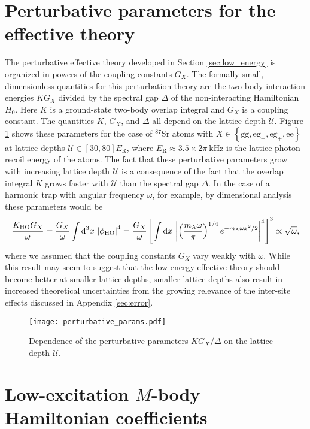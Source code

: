 \documentclass[preprint,showkeys,nofootinbib]{revtex4-1}
\renewcommand{\t}{\text} %
\newcommand{\f}{\dfrac} %
\newcommand{\p}[1]{\left(#1\right)} %
\renewcommand{\sp}[1]{\left[#1\right]} %
\renewcommand{\set}[1]{\left\{#1\right\}} %
\renewcommand{\d}{\text{d}}
\newcommand{\g}{\text{g}}
\newcommand{\e}{\text{e}}
\newcommand{\U}{\mathcal{U}}
\newcommand{\1}{\mathds{1}}
\newcommand{\mA}{m_{\text{A}}} %
\begin{document}
\section{Perturbative parameters for the effective theory}
\label{sec:pert_params}

The perturbative effective theory developed in Section
\ref{sec:low_energy} is organized in powers of the coupling constants
$G_X$.  The formally small, dimensionless quantities for this
perturbation theory are the two-body interaction energies $K G_X$
divided by the spectral gap $\Delta$ of the non-interacting
Hamiltonian $H_0$.  Here $K$ is a ground-state two-body overlap
integral and $G_X$ is a coupling constant.  The quantities $K$, $G_X$,
and $\Delta$ all depend on the lattice depth $\U$.  Figure
\ref{fig:pert_params} shows these parameters for the case of
${}^{87}$Sr atoms with $X\in\set{\g\g, \e\g_-, \e\g_+, \e\e}$ at
lattice depths $\U\in\sp{30,80}E_{\t{R}}$, where
$E_{\t{R}}\approx3.5\times2\pi~\t{kHz}$ is the lattice photon recoil
energy of the atoms.  The fact that these perturbative parameters grow
with increasing lattice depth $\U$ is a consequence of the fact that
the overlap integral $K$ grows faster with $\U$ than the spectral gap
$\Delta$.  In the case of a harmonic trap with angular frequency
$\omega$, for example, by dimensional analysis these parameters would
be
\begin{align}
  \f{K_{\t{HO}} G_X}{\omega}
  = \f{G_X}{\omega} \int \d^3 x~\abs{\phi_{\t{HO}}}^4
  = \f{G_X}{\omega} \sp{\int \d x~
    \abs{\p{\f{\mA\omega}{\pi}}^{1/4} e^{-\mA\omega x^2/2}}^4}^3
  \propto \sqrt{\omega},
\end{align}
where we assumed that the coupling constants $G_X$ vary weakly with
$\omega$.  While this result may seem to suggest that the low-energy
effective theory should become better at smaller lattice depths,
smaller lattice depths also result in increased theoretical
uncertainties from the growing relevance of the inter-site effects
discussed in Appendix \ref{sec:error}.

\begin{figure}
  \centering
  \texttt{[image: perturbative\_params.pdf]}
  \caption{\footnotesize Dependence of the perturbative parameters
    $KG_X/\Delta$ on the lattice depth $\U$.}
  \label{fig:pert_params}
\end{figure}


\section{Low-excitation $M$-body Hamiltonian coefficients}
\label{sec:U_X}
\end{document}
